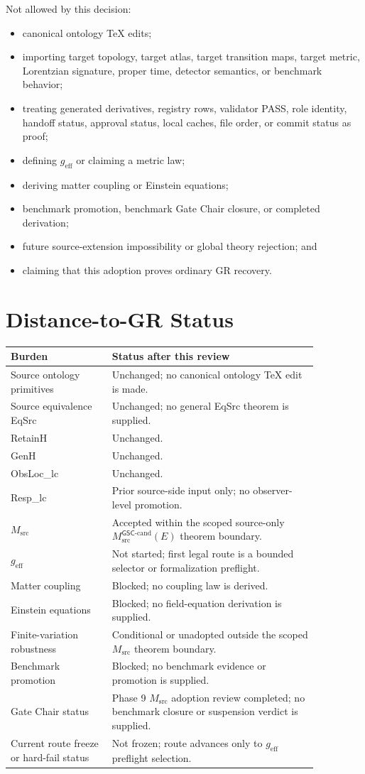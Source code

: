 \documentclass[11pt]{article}
\newcommand{\Msrc}{M_{\mathrm{src}}}
\newcommand{\Mgsccand}{M_{\mathrm{src}}^{\mathsf{GSC}\mbox{-}\mathrm{cand}}}
\newcommand{\geff}{g_{\mathrm{eff}}}
\begin{document}
Not allowed by this decision:
\begin{itemize}[leftmargin=*]
  \item canonical ontology TeX edits;
  \item importing target topology, target atlas, target transition maps,
  target metric, Lorentzian signature, proper time, detector semantics, or
  benchmark behavior;
  \item treating generated derivatives, registry rows, validator PASS, role
  identity, handoff status, approval status, local caches, file order, or
  commit status as proof;
  \item defining \(\geff\) or claiming a metric law;
  \item deriving matter coupling or Einstein equations;
  \item benchmark promotion, benchmark Gate Chair closure, or completed
  derivation;
  \item future source-extension impossibility or global theory rejection; and
  \item claiming that this adoption proves ordinary GR recovery.
\end{itemize}

\section{Distance-to-GR Status}

\begin{longtable}{p{0.28\linewidth}p{0.58\linewidth}}
\toprule
Burden & Status after this review \\
\midrule
Source ontology primitives & Unchanged; no canonical ontology TeX edit is made. \\
Source equivalence EqSrc & Unchanged; no general EqSrc theorem is supplied. \\
RetainH & Unchanged. \\
GenH & Unchanged. \\
ObsLoc\_lc & Unchanged. \\
Resp\_lc & Prior source-side input only; no observer-level promotion. \\
\(\Msrc\) & Accepted within the scoped source-only \(\Mgsccand(E)\) theorem boundary. \\
\(\geff\) & Not started; first legal route is a bounded selector or formalization preflight. \\
Matter coupling & Blocked; no coupling law is derived. \\
Einstein equations & Blocked; no field-equation derivation is supplied. \\
Finite-variation robustness & Conditional or unadopted outside the scoped \(\Msrc\) theorem boundary. \\
Benchmark promotion & Blocked; no benchmark evidence or promotion is supplied. \\
Gate Chair status & Phase 9 \(\Msrc\) adoption review completed; no benchmark closure or suspension verdict is supplied. \\
Current route freeze or hard-fail status & Not frozen; route advances only to \(\geff\) preflight selection. \\
\bottomrule
\end{longtable}
\end{document}
